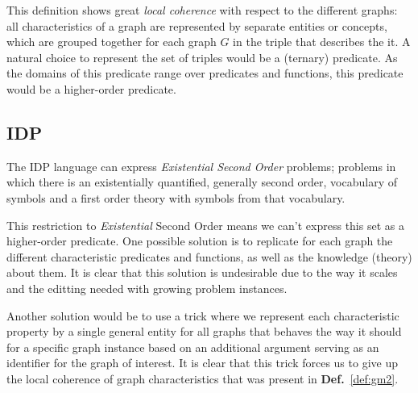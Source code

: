 \documentclass{article}
\theoremstyle{definition}
\begin{document}
This definition shows great \emph{local coherence} with respect to the different graphs: all characteristics of a graph are represented by separate entities or concepts, which are grouped together for each graph $G$ in the triple that describes the it.
A natural choice to represent the set of triples would be a (ternary) predicate.
As the domains of this predicate range over predicates and functions, this predicate would be a higher-order predicate.


\subsection{IDP}
The IDP language can express \emph{Existential Second Order} problems; problems in which there is an existentially quantified, generally second order, vocabulary of symbols and a first order theory with symbols from that vocabulary.

This restriction to \emph{Existential} Second Order means we can't express this set as a higher-order predicate. One possible solution is to replicate for each graph the different characteristic predicates and functions, as well as the knowledge (theory) about them.
It is clear that this solution is undesirable due to the way it scales and the editting needed with growing problem instances.

Another solution would be to use a trick where we represent each characteristic property by a single general entity for all graphs that behaves the way it should for a specific graph instance based on an additional argument serving as an identifier for the graph of interest.
It is clear that this trick forces us to give up the local coherence of graph characteristics that was present in \textbf{Def.}~\ref{def:gm2}.
\end{document}
